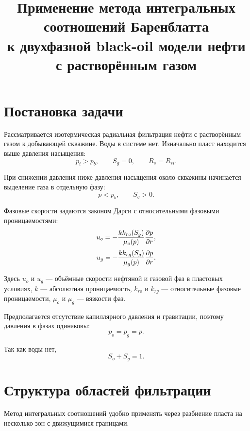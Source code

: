\documentclass[12pt,a4paper]{article}
\title{Применение метода интегральных соотношений Баренблатта\\
к двухфазной black-oil модели нефти с растворённым газом}
\author{}
\date{}
\begin{document}
\maketitle

\section{Постановка задачи}

Рассматривается изотермическая радиальная фильтрация нефти с растворённым газом к добывающей скважине.
Воды в системе нет. Изначально пласт находится выше давления насыщения:
\begin{equation}
    p_i > p_b, \qquad S_g = 0, \qquad R_s = R_{si}.
\end{equation}

При снижении давления ниже давления насыщения около скважины начинается выделение газа в отдельную фазу:
\begin{equation}
    p < p_b, \qquad S_g > 0.
\end{equation}

Фазовые скорости задаются законом Дарси с относительными фазовыми проницаемостями:
\begin{equation}
    u_o = - \frac{k k_{ro}(S_g)}{\mu_o(p)} \pdv{p}{r},
\end{equation}
\begin{equation}
    u_g = - \frac{k k_{rg}(S_g)}{\mu_g(p)} \pdv{p}{r}.
\end{equation}

Здесь $u_o$ и $u_g$ --- объёмные скорости нефтяной и газовой фаз в пластовых условиях, $k$ --- абсолютная проницаемость, $k_{ro}$ и $k_{rg}$ --- относительные фазовые проницаемости, $\mu_o$ и $\mu_g$ --- вязкости фаз.

Предполагается отсутствие капиллярного давления и гравитации, поэтому давления в фазах одинаковы:
\begin{equation}
    p_o = p_g = p.
\end{equation}

Так как воды нет,
\begin{equation}
    S_o + S_g = 1.
\end{equation}

\section{Структура областей фильтрации}

Метод интегральных соотношений удобно применять через разбиение пласта на несколько зон с движущимися границами.
\end{document}
